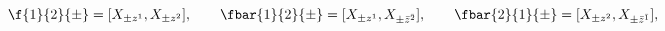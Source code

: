 \begin{equation}
 \f{1}{2}{\pm}= [X_{\pm z^1},X_{\pm z^2}],\qquad
 \fbar{1}{2}{\pm}=[X_{\pm z^1},X_{\pm\bar{z}^{\bar{2}}}],\qquad
 \fbar{2}{1}{\pm}=[X_{\pm z^2},X_{\pm\bar{z}^{\bar{1}}}],\qquad
\end{equation}

